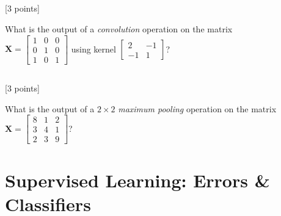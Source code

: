 \documentclass[12pt]{article}
\newcommand{\tcv}[1]{\textcolor{m4}{#1}}
\newcounter{totalpoints}
\newcommand{\points}[1]{{\addtocounter{totalpoints}{#1}\tcv{[#1 points]}}}
\begin{document}
{\subsection{} \points{3}
    What is the output of a \emph{convolution} operation on the matrix\\
    $\mathbf{X} = \begin{bmatrix}
                      1 & 0 & 0 \\
                      0 & 1 & 0 \\
                      1 & 0 & 1
                  \end{bmatrix}$
    using kernel $\begin{bmatrix}
                      2 & -1 \\
                      -1 & 1
                  \end{bmatrix}$?

\begin{answer}{2in}
\end{answer}

\subsection{} \points{3}
    What is the output of a $2\times2$ \emph{maximum pooling} operation on the matrix
    $\mathbf{X} = \begin{bmatrix}
                      8 & 1 & 2 \\
                      3 & 4 & 1 \\
                      2 & 3 & 9
                  \end{bmatrix}$?

\begin{answer}{3in}
\end{answer}


\section{Supervised Learning: Errors \& Classifiers}

}
\end{document}
